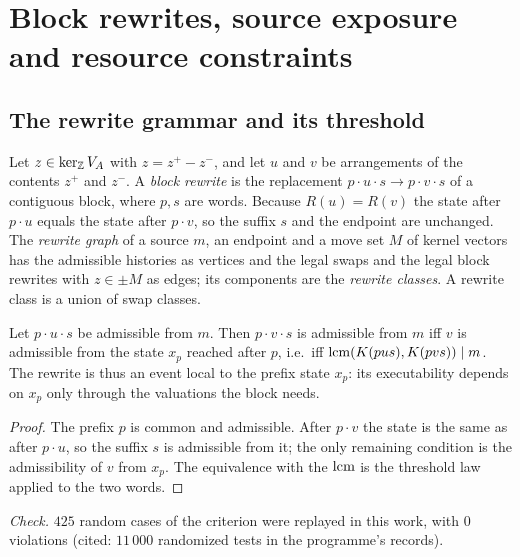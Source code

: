 \section{Block rewrites, source exposure and resource constraints}\label{sec:rewrites}
\subsection{The rewrite grammar and its threshold}
\begin{definition}[rewrite]\label{def:rewrite}
Let $z\in\ker_{\mathbb Z}V_A$ with $z=z^+-z^-$, and let $u$ and $v$ be arrangements of the contents $z^+$ and $z^-$. A \emph{block rewrite} is the replacement $p\cdot u\cdot s\to p\cdot v\cdot s$ of a contiguous block, where $p,s$ are words. Because $R(u)=R(v)$ the state after $p\cdot u$ equals the state after $p\cdot v$, so the suffix $s$ and the endpoint are unchanged. The \emph{rewrite graph} of a source $m$, an endpoint and a move set $M$ of kernel vectors has the admissible histories as vertices and the legal swaps and the legal block rewrites with $z\in\pm M$ as edges; its components are the \emph{rewrite classes}. A rewrite class is a union of swap classes.
\end{definition}
\begin{theorem}\label{thm:block}
Let $p\cdot u\cdot s$ be admissible from $m$. Then $p\cdot v\cdot s$ is admissible from $m$ iff $v$ is admissible from the state $x_p$ reached after $p$, i.e.\ iff $\operatorname{lcm}(K(p u s),K(p v s))\mid m$. The rewrite is thus an event local to the prefix state $x_p$: its executability depends on $x_p$ only through the valuations the block needs.
\end{theorem}
\begin{proof}
The prefix $p$ is common and admissible. After $p\cdot v$ the state is the same as after $p\cdot u$, so the suffix $s$ is admissible from it; the only remaining condition is the admissibility of $v$ from $x_p$. The equivalence with the $\operatorname{lcm}$ is the threshold law applied to the two words.
\end{proof}
\emph{Check.} $425$ random cases of the criterion were replayed in this work, with $0$ violations (cited: $11\,000$ randomized tests in the programme's records).

